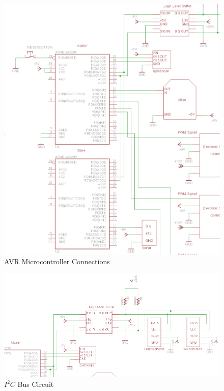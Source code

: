 \begin{figure}[htb]
\begin{center}
\includegraphics{masterslaveschem}
\caption{AVR Microcontroller Connections}
\end{center}
\end{figure}

\begin{figure}[htb]
\begin{center}
\includegraphics{i2cbusschem}
\caption{$I^2C$ Bus Circuit} 
\end{center}
\end{figure}
